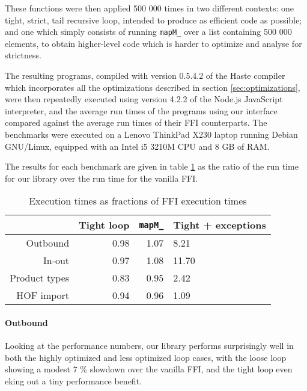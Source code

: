 \documentclass{sigplanconf}
\begin{document}
These functions were then applied 500 000 times in two different contexts: one
tight, strict, tail recursive loop, intended to produce as efficient code
as possible; and one which simply consists of running \lstinline!mapM_! over
a list containing 500 000 elements, to obtain higher-level code which is harder to
optimize and analyse for strictness.

The resulting programs, compiled with version 0.5.4.2 of the Haste compiler
which incorporates all the optimizations described in section \ref{sec:optimizations},
were then repeatedly executed using version 4.2.2 of the Node.js JavaScript interpreter,
and the average run times of the programs using our interface compared against
the average run times of their FFI counterparts.
The benchmarks were executed on a Lenovo ThinkPad X230 laptop running Debian GNU/Linux,
equipped with an Intel i5 3210M CPU and 8 GB of RAM.

The results for each benchmark are given in table \ref{tbl:performance} as
the ratio of the run time for our library over the run time for the vanilla
FFI.

\begin{table}
  \renewcommand{\arraystretch}{1.5}
  \begin{center}
    \begin{tabular}{|r|r|r|l|}
      \hline
                    & Tight loop & \lstinline!mapM_! & Tight + exceptions\\
      \hline
      Outbound      & 0.98       & 1.07              & 8.21\\
      \hline
      In-out        & 0.97       & 1.08              & 11.70\\
      \hline
      Product types & 0.83       & 0.95              & 2.42\\
      \hline
      HOF import    & 0.94       & 0.96              & 1.09\\
      \hline
    \end{tabular}
  \end{center}
  \caption{Execution times as fractions of FFI execution times}
  \label{tbl:performance}
\end{table}

\paragraph{Outbound}
Looking at the performance numbers, our library performs surprisingly well in
both the highly optimized and less optimized loop cases, with the loose loop
showing a modest 7 \% slowdown over the vanilla FFI, and the tight loop even
eking out a tiny performance benefit.
\end{document}
